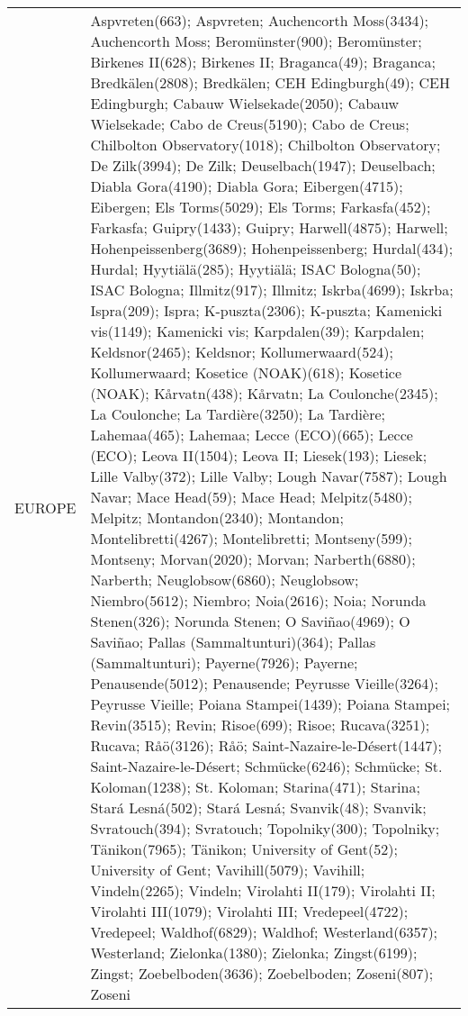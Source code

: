 \documentclass[journal abbreviation, manuscript]{copernicus}
\begin{document}
\begin{table}
\begin{tabularx}{\textwidth}{lX}
  EUROPE   & Aspvreten(663); Aspvreten; Auchencorth Moss(3434); Auchencorth Moss; Beromünster(900); Beromünster; Birkenes II(628); Birkenes II; Braganca(49); Braganca; Bredkälen(2808); Bredkälen; CEH Edingburgh(49); CEH Edingburgh; Cabauw Wielsekade(2050); Cabauw Wielsekade; Cabo de Creus(5190); Cabo de Creus; Chilbolton Observatory(1018); Chilbolton Observatory; De Zilk(3994); De Zilk; Deuselbach(1947); Deuselbach; Diabla Gora(4190); Diabla Gora; Eibergen(4715); Eibergen; Els Torms(5029); Els Torms; Farkasfa(452); Farkasfa; Guipry(1433); Guipry; Harwell(4875); Harwell; Hohenpeissenberg(3689); Hohenpeissenberg; Hurdal(434); Hurdal; Hyytiälä(285); Hyytiälä; ISAC Bologna(50); ISAC Bologna; Illmitz(917); Illmitz; Iskrba(4699); Iskrba; Ispra(209); Ispra; K-puszta(2306); K-puszta; Kamenicki vis(1149); Kamenicki vis; Karpdalen(39); Karpdalen; Keldsnor(2465); Keldsnor; Kollumerwaard(524); Kollumerwaard; Kosetice (NOAK)(618); Kosetice (NOAK); Kårvatn(438); Kårvatn; La Coulonche(2345); La Coulonche; La Tardière(3250); La Tardière; Lahemaa(465); Lahemaa; Lecce (ECO)(665); Lecce (ECO); Leova II(1504); Leova II; Liesek(193); Liesek; Lille Valby(372); Lille Valby; Lough Navar(7587); Lough Navar; Mace Head(59); Mace Head; Melpitz(5480); Melpitz; Montandon(2340); Montandon; Montelibretti(4267); Montelibretti; Montseny(599); Montseny; Morvan(2020); Morvan; Narberth(6880); Narberth; Neuglobsow(6860); Neuglobsow; Niembro(5612); Niembro; Noia(2616); Noia; Norunda Stenen(326); Norunda Stenen; O Saviñao(4969); O Saviñao; Pallas (Sammaltunturi)(364); Pallas (Sammaltunturi); Payerne(7926); Payerne; Penausende(5012); Penausende; Peyrusse Vieille(3264); Peyrusse Vieille; Poiana Stampei(1439); Poiana Stampei; Revin(3515); Revin; Risoe(699); Risoe; Rucava(3251); Rucava; Råö(3126); Råö; Saint-Nazaire-le-Désert(1447); Saint-Nazaire-le-Désert; Schmücke(6246); Schmücke; St. Koloman(1238); St. Koloman; Starina(471); Starina; Stará Lesná(502); Stará Lesná; Svanvik(48); Svanvik; Svratouch(394); Svratouch; Topolniky(300); Topolniky; Tänikon(7965); Tänikon; University of Gent(52); University of Gent; Vavihill(5079); Vavihill; Vindeln(2265); Vindeln; Virolahti II(179); Virolahti II; Virolahti III(1079); Virolahti III; Vredepeel(4722); Vredepeel; Waldhof(6829); Waldhof; Westerland(6357); Westerland; Zielonka(1380); Zielonka; Zingst(6199); Zingst; Zoebelboden(3636); Zoebelboden; Zoseni(807); Zoseni                                                                                                                                                                                                                                                                                                                                                                                                                                                                                                                                                                                                                                                                                                                                                                                                                                                                                                                       
\end{tabularx}
\end{table}
\end{document}
